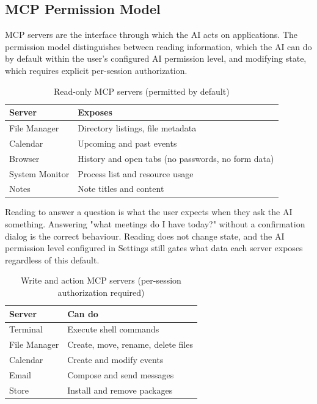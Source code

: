 \subsection{MCP Permission Model}
\label{sec:mcp-permissions}

MCP servers are the interface through which the AI acts on applications.
The permission model distinguishes between reading information, which the AI
can do by default within the user's configured AI permission level, and
modifying state, which requires explicit per-session authorization.

\begin{table}[htbp]
\caption{Read-only MCP servers (permitted by default)}
\label{tab:mcp-read}
\begin{tabularx}{\linewidth}{lX}
\toprule
\textbf{Server} & \textbf{Exposes} \\
\midrule
File Manager   & Directory listings, file metadata \\
Calendar       & Upcoming and past events \\
Browser        & History and open tabs (no passwords, no form data) \\
System Monitor & Process list and resource usage \\
Notes          & Note titles and content \\
\bottomrule
\end{tabularx}
\end{table}

Reading to answer a question is what the user expects when they ask the AI
something. Answering "what meetings do I have today?" without a confirmation
dialog is the correct behaviour. Reading does not change state, and the AI
permission level configured in Settings still gates what data each server
exposes regardless of this default.

\begin{table}[htbp]
\caption{Write and action MCP servers (per-session authorization required)}
\label{tab:mcp-write}
\begin{tabularx}{\linewidth}{lX}
\toprule
\textbf{Server} & \textbf{Can do} \\
\midrule
Terminal     & Execute shell commands \\
File Manager & Create, move, rename, delete files \\
Calendar     & Create and modify events \\
Email        & Compose and send messages \\
Store        & Install and remove packages \\
\bottomrule
\end{tabularx}
\end{table}

